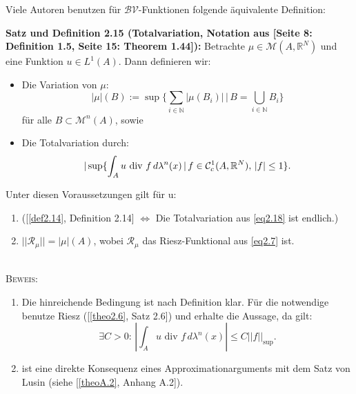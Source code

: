 Viele Autoren benutzen für \(\mathcal{BV}\)-Funktionen folgende äquivalente Definition:\\[0.5cm]
\colorbox{generalYellow}{\begin{minipage}{16cm}{\textcolor{black}{}{\label{def2.15}}}
\textbf{Satz und Definition 2.15 (Totalvariation, Notation aus \cite{BraidesApprox}[Seite 8: Definition 1.5, Seite 15: Theorem 1.44]):} Betrachte \(\mu \in \mathcal{M}(A,\mathbb{R}^N)\) und eine Funktion \(u \in L^1(A)\). Dann definieren wir:
\begin{itemize}
    \item Die Variation von \(\mu\): 
    \begin{equation}
        |\mu|(B) := \sup \{\sum_{i \in \mathbb{N}} |\mu(B_i)| \, | \, B = \bigcup_{i \in \mathbb{N}} B_i\}
    \end{equation}
    für alle \(B \subset \mathcal{M}^n(A)\), sowie 
    \item Die Totalvariation durch:
\begin{equation}{\label{eq2.18}}
    |\sup \{\int_A u \text{ div }f \, d\lambda^n(x) \, | \, f \in \mathcal{C}^1_c(A,\mathbb{R}^N), \, |f| \leq 1 \}.
\end{equation}
\end{itemize}
Unter diesen Voraussetzungen gilt für u:
\begin{enumerate}
    \item ([\ref{def2.14}, Definition 2.14] \(\Leftrightarrow\) Die Totalvariation aus \eqref{eq2.18} ist endlich.)
    \item \(||\mathcal{R}_{\mu}|| = |\mu|(A)\), wobei \(\mathcal{R}_{\mu}\) das Riesz-Funktional aus \eqref{eq2.7} ist.
\end{enumerate}
\end{minipage}}\\

\textsc{Beweis:}
\begin{enumerate}
    \item Die hinreichende Bedingung ist nach Definition klar. Für die notwendige benutze Riesz ([\ref{theo2.6}, Satz 2.6]) und erhalte die Aussage, da gilt:
    \begin{equation}
        \exists C > 0 :\, |\int_A u \text{ div }f \, d\lambda^n(x)| \leq C ||f||_{\text{sup}}.
    \end{equation}
    \item ist eine direkte Konsequenz eines Approximationarguments mit dem Satz von Lusin (siehe [\ref{theoA.2}, Anhang A.2]). \QEDB
\end{enumerate}

